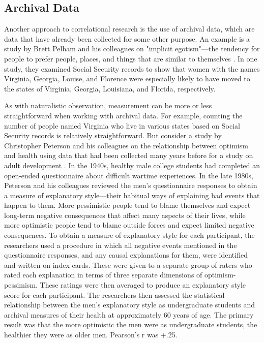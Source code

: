 \subsection{Archival Data}


Another approach to correlational research is the use of archival data, which are data that have already been collected for some other purpose. An example is a study by Brett Pelham and his colleagues on "implicit egotism"---the tendency for people to prefer people, places, and things that are similar to themselves \citep{pelham_implicit_2005}. In one study, they examined Social Security records to show that women with the names Virginia, Georgia, Louise, and Florence were especially likely to have moved to the states of Virginia, Georgia, Louisiana, and Florida, respectively.


As with naturalistic observation, measurement can be more or less straightforward when working with archival data. For example, counting the number of people named Virginia who live in various states based on Social Security records is relatively straightforward. But consider a study by Christopher Peterson and his colleagues on the relationship between optimism and health using data that had been collected many years before for a study on adult development \citep{peterson_pessimistic_1988}. In the 1940s, healthy male college students had completed an open-ended questionnaire about difficult wartime experiences. In the late 1980s, Peterson and his colleagues reviewed the men's questionnaire responses to obtain a measure of explanatory style---their habitual ways of explaining bad events that happen to them. More pessimistic people tend to blame themselves and expect long-term negative consequences that affect many aspects of their lives, while more optimistic people tend to blame outside forces and expect limited negative consequences. To obtain a measure of explanatory style for each participant, the researchers used a procedure in which all negative events mentioned in the questionnaire responses, and any causal explanations for them, were identified and written on index cards. These were given to a separate group of raters who rated each explanation in terms of three separate dimensions of optimism-pessimism. These ratings were then averaged to produce an explanatory style score for each participant. The researchers then assessed the statistical relationship between the men's explanatory style as undergraduate students and archival measures of their health at approximately 60 years of age. The primary result was that the more optimistic the men were as undergraduate students, the healthier they were as older men. Pearson's r was +.25.


